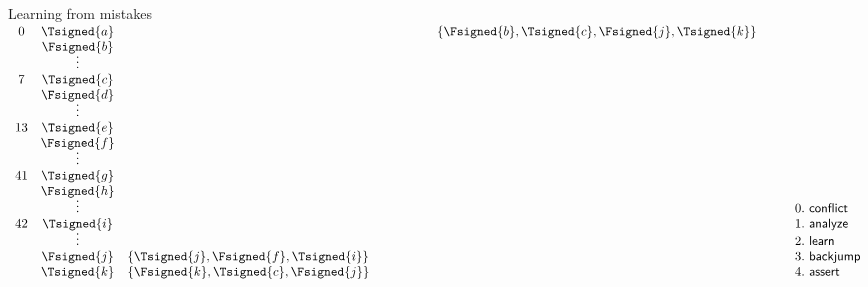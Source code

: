 \begin{frame}{Learning from mistakes}
  \small\medskip
  \(
  \begin{array}{cclp{33pt}rp{10pt}l}
    0 & \Tsigned{a}&                                       &&\{\Fsigned{b},\Tsigned{c},\Fsigned{j},\Tsigned{k}\}&&\\
      & \Fsigned{b}\\[-5pt]
      & \vdots\\
    7 & \Tsigned{c}\\
      & \Fsigned{d}\\[-5pt]
      & \vdots\\
   13 & \Tsigned{e}\\
      & \Fsigned{f}\\[-5pt]
      & \vdots\\
   41 & \Tsigned{g}\\
      & \Fsigned{h}\\[-5pt]
      & \vdots     &                                       &&&&0.~\mathsf{conflict}\\
   42 & \Tsigned{i}&                                       &&&&1.~\mathsf{analyze}\\[-5pt]
      & \vdots     &                                       &&&&2.~\mathsf{learn}\\
      & \Fsigned{j}&\{\Tsigned{j},\Fsigned{f},\Tsigned{i}\}&&&&3.~\mathsf{backjump}\\
      & \Tsigned{k}&\{\Fsigned{k},\Tsigned{c},\Fsigned{j}\}&&&&4.~\mathsf{assert}
  \end{array}
  \)
\end{frame}
%
